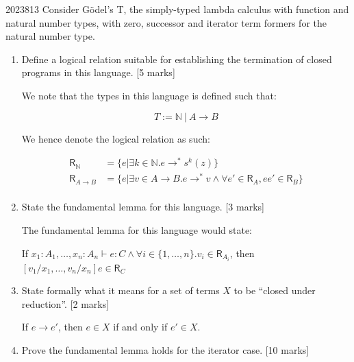 \documentclass[10pt,\jkfside,a4paper]{article}
\newcommand{\answer}[1]{
    \begin{tcolorbox}[colframe=black, colback=white, sharp corners, boxrule=0.2mm, breakable]
        #1
    \end{tcolorbox}
}
\newcommand{\qmarks}[1]{\hspace*{\fill}[#1]}
\begin{document}
\begin{examquestion}{2023}{8}{13}
    Consider G\"odel's T, the simply-typed lambda calculus with function and natural
    number types, with zero, successor and iterator term formers for the natural
    number type.

    \begin{enumerate}
        \item
            Define a logical relation suitable for establishing the termination of
            closed programs in this language. \qmarks{5 marks}

            \answer{ 
                We note that the types in this language is defined such that: 

                \[ 
                    T := \mathbb{N} \  |\  A \to B 
                \]

                We hence denote the logical relation as such: 

                \begin{align*} 
                    \mathsf{R}_{\mathbb{N}} &= \{e | \exists k \in \mathbb{N}. e \to^* s^k(z)\} \\ 
                    \mathsf{R}_{A \to B} &= \{e | \exists v \in A \to B. e \to^* v \wedge \forall e' \in \mathsf{R}_A,  e e' \in \mathsf{R}_B\} \\ 
                \end{align*}
            }

        \item
            State the fundamental lemma for this language. \qmarks{3 marks}

            \answer{
                The fundamental lemma for this language would state: 

                If $x_1 : A_1, \ldots, x_n : A_n \vdash e : C \wedge \forall i \in \{ 1, \ldots, n \}. v_i \in \mathsf{R}_{A_i}$, then $[v_1 / x_1, \ldots, v_n / x_n] e \in \mathsf{R}_{C}$
            }

        \item
            State formally what it means for a set of terms $X$ to be ``closed under
            reduction''. \qmarks{2 marks}

            \answer{ 
                If $e \to e'$, then $e \in X$ if and only if $e' \in X$. 
            }

        \item
            Prove the fundamental lemma holds for the iterator case. \qmarks{10 marks}


\end{enumerate}
\end{examquestion}
\end{document}
